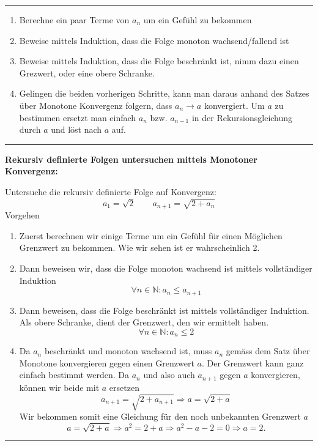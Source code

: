 \documentclass[a4paper,landscape,8pt]{extarticle}
\newcommand{\N}{\mathbb{N}}
\newcommand{\sep}{\vspace{5pt}\noindent\hrule\vspace{5pt}}
\begin{document}
\begin{multicols*}{4}
\sep

\Vorgehen
\begin{enumerate}
  \item Berechne ein paar Terme von $a_n$ um ein Gefühl zu bekommen	
  \item Beweise mittels Induktion, dass die Folge monoton wachsend/fallend ist
  \item Beweise mittels Induktion, dass die Folge beschränkt ist, nimm dazu
  einen Grezwert, oder eine obere Schranke.
  \item Gelingen die beiden vorherigen Schritte, kann man daraus anhand des
  Satzes über Monotone Konvergenz folgern, dass $a_n\to a$ konvergiert. Um $a$
  zu bestimmen ersetzt man einfach $a_n$ bzw. $a_{n-1}$ in der
  Rekursionsgleichung durch $a$ und löst nach $a$ auf.
\end{enumerate}

\begin{warmup}
\sep

\textbf{Rekursiv definierte Folgen untersuchen mittels Monotoner Konvergenz:}

\Bsp Untersuche die rekursiv definierte Folge auf Konvergenz:
\[
a_1 = \sqrt{2} \qquad a_{n+1} =\sqrt{2 + a_n}
\]
Vorgehen
\begin{enumerate}
  \item Zuerst berechnen wir einige Terme um ein Gefühl für einen Möglichen
  Grenzwert zu bekommen. Wie wir sehen ist er wahrscheinlich 2.
  \item Dann beweisen wir, dass die Folge monoton wachsend ist mittels
  vollständiger Induktion 
  \[
  \forall n \in \N : a_n \leq a_{n+1}
  \]
  \item Dann beweisen, dass die Folge beschränkt ist mittels vollständiger
  Induktion. Als obere Schranke, dient der Grenzwert, den wir ermittelt haben.
  \[
  \forall n\in \N : a_n \leq 2
  \]
  \item Da $a_n$ beschränkt und monoton wachsend ist, muss $a_n$ gemäss dem
  Satz über Monotone konvergieren gegen einen Grenzwert $a$. Der Grenzwert kann
  ganz einfach bestimmt werden. Da $a_n$ und also auch $a_{n+1}$ gegen $a$ 
  konvergieren, können wir beide mit $a$ ersetzen 
  \[
  	a_{n+1} = \sqrt{2 + a_{n+1}} \Longrightarrow a = \sqrt{2+a}
  \]
  Wir bekommen somit eine Gleichung für den noch unbekannten Grenzwert $a$
  \[
  a = \sqrt{2+a} \Longrightarrow a^2 = 2 + a \Longrightarrow a^2-a-2=0
  \Longrightarrow a= 2.
  \]
\end{enumerate}

\sep


\end{warmup}
\end{multicols*}
\end{document}
